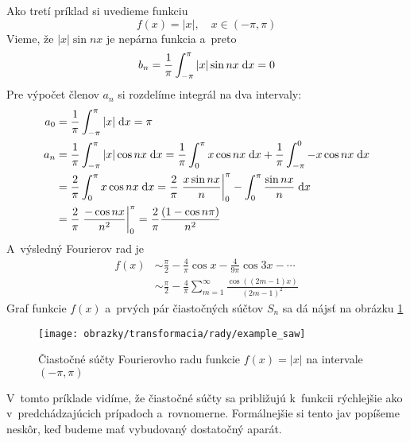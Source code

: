 \begin{priklad}
    Ako tretí príklad si uvedieme funkciu
    \begin{equation*}
        f(x) = |x|, \quad x\in(-\pi,\pi)
    \end{equation*}
    Vieme, že $|x| \sin nx$ je nepárna funkcia a~preto
    \begin{equation*}
        b_n = \frac{1}{\pi} \int_{-\pi}^{\pi} |x| \sin nx \; \mathrm{d} x = 0
    \end{equation*}
    Pre výpočet členov $a_n$ si rozdelíme integrál na dva intervaly:
    \begin{equation*}
    \begin{split}
        a_0 &= \frac{1}{\pi} \int_{-\pi}^{\pi} |x| \; \mathrm{d} x = \pi \\
        a_n &= \frac{1}{\pi} \int_{-\pi}^{\pi} |x| \cos nx \; \mathrm{d} x 
            = \frac{1}{\pi} \int_0^{\pi} x \cos nx \; \mathrm{d} x +
                \frac{1}{\pi} \int_{-\pi}^0 -x \cos nx \; \mathrm{d} x \\
            &= \frac{2}{\pi} \int_0^{\pi} x \cos nx \; \mathrm{d} x 
             = \frac{2}{\pi} \left.
                \frac{x \sin nx}{n}
                \right|_0^{\pi} -
                \int_0^{\pi} \frac{\sin nx}{n} \; \mathrm{d} x \\
            &= \frac{2}{\pi} \left.
                    \frac{-\cos nx}{n^2} \right|_0^\pi 
            = \frac{2}{\pi} \frac{(1-\cos n\pi)}{n^2}
    \end{split}
    \end{equation*}
    A~výsledný Fourierov rad je
    \begin{equation*}
    \begin{split}
        f(x) &\sim \frac{\pi}{2} - \frac{4}{\pi} \cos x -
            \frac{4}{9\pi} \cos 3x - \cdots \\
            &\sim \frac{\pi}{2} - \frac{4}{\pi}
                \sum_{m=1}^{\infty} \frac{\cos \left((2m-1) x\right)}{(2m-1)^2}            
    \end{split}
    \end{equation*}
    Graf funkcie $f(x)$ a~prvých pár čiastočných súčtov $S_n$ sa dá
    nájsť na obrázku \ref{fig:example_saw}

    \begin{figure}[htp]
        \centering
        \texttt{[image: obrazky/transformacia/rady/example\_saw]}
        \caption{Čiastočné súčty Fourierovho radu funkcie $f(x)=|x|$ na
        intervale $(-\pi,\pi)$}
        \label{fig:example_saw}
    \end{figure}    
 V~tomto príklade vidíme, že čiastočné súčty sa približujú k~funkcii
 rýchlejšie ako v~predchádzajúcich prípadoch a~rovnomerne.
 Formálnejšie si tento jav popíšeme neskôr, keď budeme mať vybudovaný
 dostatočný aparát.
 \label{priklad:fourier_series_abs}
\end{priklad}

